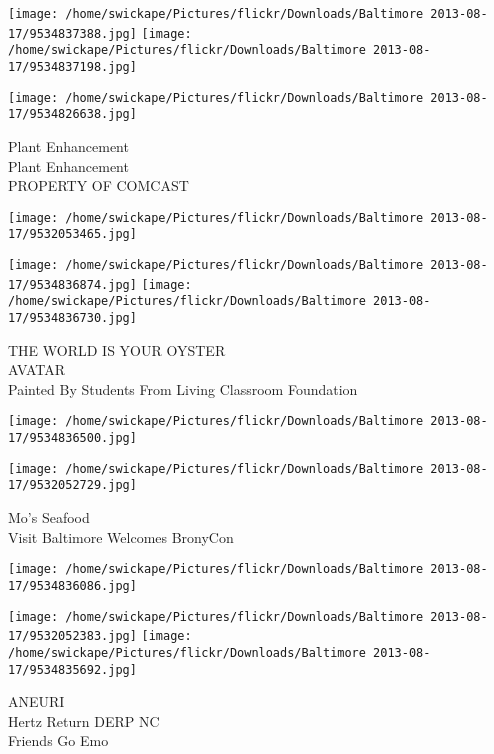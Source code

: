 \documentclass[10pt,letterpaper]{article}
\begin{document}
\texttt{[image: /home/swickape/Pictures/flickr/Downloads/Baltimore 2013-08-17/9534837388.jpg]}
\texttt{[image: /home/swickape/Pictures/flickr/Downloads/Baltimore 2013-08-17/9534837198.jpg]}

\texttt{[image: /home/swickape/Pictures/flickr/Downloads/Baltimore 2013-08-17/9534826638.jpg]}

Plant Enhancement\\
Plant Enhancement\\
PROPERTY OF COMCAST\\
\pagebreak

\texttt{[image: /home/swickape/Pictures/flickr/Downloads/Baltimore 2013-08-17/9532053465.jpg]}

\vspace{0.25in}
\texttt{[image: /home/swickape/Pictures/flickr/Downloads/Baltimore 2013-08-17/9534836874.jpg]}
\texttt{[image: /home/swickape/Pictures/flickr/Downloads/Baltimore 2013-08-17/9534836730.jpg]}

THE WORLD IS YOUR OYSTER\\
AVATAR\\
Painted By Students From Living Classroom Foundation\\
\pagebreak

\texttt{[image: /home/swickape/Pictures/flickr/Downloads/Baltimore 2013-08-17/9534836500.jpg]}

\vspace{0.25in}
\texttt{[image: /home/swickape/Pictures/flickr/Downloads/Baltimore 2013-08-17/9532052729.jpg]}

Mo's Seafood\\
Visit Baltimore Welcomes BronyCon\\
\pagebreak

\texttt{[image: /home/swickape/Pictures/flickr/Downloads/Baltimore 2013-08-17/9534836086.jpg]}

\vspace{0.25in}
\texttt{[image: /home/swickape/Pictures/flickr/Downloads/Baltimore 2013-08-17/9532052383.jpg]}
\texttt{[image: /home/swickape/Pictures/flickr/Downloads/Baltimore 2013-08-17/9534835692.jpg]}

ANEURI\\
Hertz Return DERP NC\\
Friends Go Emo\\
\pagebreak
\end{document}
